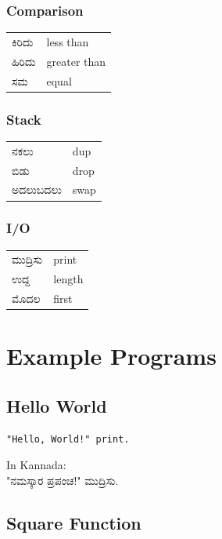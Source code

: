 \documentclass[11pt,a4paper]{report}
\newcommand{\kannada}[1]{{\kannadafont #1}}
\begin{document}
\subsection{Comparison}
\begin{tabular}{ll}
\kannada{ಕಿರಿದು} & less than \\
\kannada{ಹಿರಿದು} & greater than \\
\kannada{ಸಮ} & equal \\
\end{tabular}

\subsection{Stack}
\begin{tabular}{ll}
\kannada{ನಕಲು} & dup \\
\kannada{ಬಿಡು} & drop \\
\kannada{ಅದಲುಬದಲು} & swap \\
\end{tabular}

\subsection{I/O}
\begin{tabular}{ll}
\kannada{ಮುದ್ರಿಸು} & print \\
\kannada{ಉದ್ದ} & length \\
\kannada{ಮೊದಲ} & first \\
\end{tabular}

\chapter{Example Programs}

\section{Hello World}

\begin{verbatim}
"Hello, World!" print.
\end{verbatim}

In Kannada:\\
\kannada{"ನಮಸ್ಕಾರ ಪ್ರಪಂಚ!" ಮುದ್ರಿಸು.}

\section{Square Function}
\end{document}
